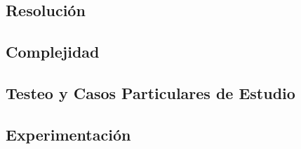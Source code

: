 \subsection{Resoluci\'on}
    

\subsection{Complejidad}
    

\subsection{Testeo y Casos Particulares de Estudio}
    

\subsection{Experimentaci\'on}
    
